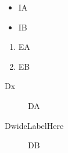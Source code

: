 \documentclass[10pt]{article}
\begin{document}
\begin{itemize}
\item[Ix] IA
\item[IwideLabelHere] IB
\end{itemize}
\newpage
\begin{enumerate}
\item[Ex] EA
\item[EwideLabelHere] EB
\end{enumerate}
\newpage
\begin{description}
\item[Dx] DA
\item[DwideLabelHere] DB
\end{description}
\end{document}
